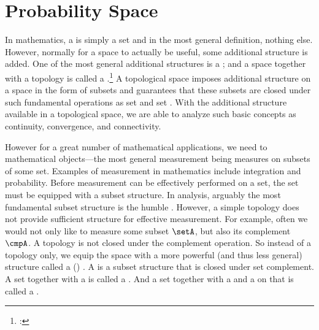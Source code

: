 
\section{Probability Space}
In mathematics, a  is simply a set and in the most general definition,
nothing else.
However, normally for a space to actually be useful, some additional structure is added.
One of the most general additional structures is a ;
and a space together with a topology is called a
.\footnote{: }
A topological space imposes additional structure on a space  in the form of subsets
and guarantees that these subsets are closed under such fundamental operations as
set  and set .
With the additional structure available in a topological space, we are able to
analyze such basic concepts as
continuity,
convergence, and
connectivity.

However for a great number of mathematical applications,
we need to  mathematical objects---the most general measurement being measures on subsets of some set.
Examples of measurement in mathematics include integration and probability.
Before measurement can be effectively performed on a set,
the set must be equipped with a subset structure.
In analysis, arguably the most fundamental subset structure is the humble  .
However, a simple topology does not provide sufficient structure
for effective measurement.
For example,
often we would not only like to measure some subset $\setA$,
but also its complement $\cmpA$.
A topology is not closed under the complement operation.
So instead of a topology only, we equip the space with a more powerful (and thus less general) structure
called a  () .
A  is a subset structure that is closed under set complement.
A set together with a  is called a .
And a set together with a  and a  on that 
is called a  .


